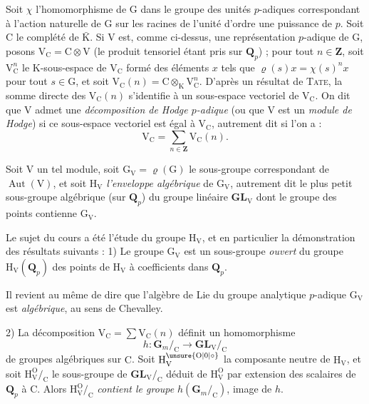 Soit $\chi$ l’homomorphisme de $\mathrm{G}$ dans le groupe des unités $p$-adiques correspondant à l’action naturelle de $\mathrm{G}$ sur les racines de l’unité d’ordre une puissance de $p$. Soit $\mathrm{C}$ le complété de $\bar{\mathrm{K}}$. Si $\mathrm{V}$ est, comme ci-dessus, une représentation $p$-adique de $\mathrm{G}$, posons $\mathrm{V}_{\mathrm{C}}=\mathrm{C}\otimes\mathrm{V}$ (le produit tensoriel étant pris sur $\mathbf{Q}_p$) ; pour tout $n\in\mathbf{Z}$, soit $\mathrm{V}_{\mathrm{C}}^n$ le $\mathrm{K}$-sous-espace de $\mathrm{V}_{\mathrm{C}}$ formé des éléments $x$ tels que $\varrho(s)x=\chi(s)^nx$ pour tout $s\in\mathrm{G}$, et soit $\mathrm{V}_{\mathrm{C}}(n)=\mathrm{C}\otimes_{\mathrm{K}}\mathrm{V}_{\mathrm{C}}^n$. D’après un résultat de \textsc{Tate}, la somme directe des $\mathrm{V}_{\mathrm{C}}(n)$ s’identifie à un sous-espace vectoriel de $\mathrm{V}_{\mathrm{C}}$. On dit que $\mathrm{V}$ admet une \textit{décomposition de Hodge $p$-adique} (ou que $\mathrm{V}$ est un \textit{module de Hodge}) si ce sous-espace vectoriel est égal à $\mathrm{V}_{\mathrm{C}}$, autrement dit si l’on a :
\[
\mathrm{V}_{\mathrm{C}}=\sum_{n\in\mathbf{Z}}\mathrm{V}_{\mathrm{C}}(n).
\]

Soit $\mathrm{V}$ un tel module, soit $\mathrm{G}_{\mathrm{V}}=\varrho(\mathrm{G})$ le sous-groupe correspondant de $\operatorname{Aut}(\mathrm{V})$, et soit $\mathrm{H}_{\mathrm{V}}$ \textit{l’enveloppe algébrique} de $\mathrm{G}_{\mathrm{V}}$, autrement dit le plus petit sous-groupe algébrique (sur $\mathbf{Q}_p$) du groupe linéaire $\mathbf{GL}_{\mathrm{V}}$ dont le groupe des points contienne $\mathrm{G}_{\mathrm{V}}$.

Le sujet du cours a été l’étude du groupe $\mathrm{H}_{\mathrm{V}}$, et en particulier la démonstration des résultats suivants :
1) Le groupe $\mathrm{G}_{\mathrm{V}}$ est un sous-groupe \textit{ouvert} du groupe $\mathrm{H}_{\mathrm{V}}(\mathbf{Q}_p)$ des points de $\mathrm{H}_{\mathrm{V}}$ à coefficients dans $\mathbf{Q}_p$.

Il revient au même de dire que l’algèbre de Lie du groupe analytique $p$-adique $\mathrm{G}_{\mathrm{V}}$ est \textit{algébrique}, au sens de Chevalley.

2) La décomposition $\mathrm{V}_{\mathrm{C}}=\sum\mathrm{V}_{\mathrm{C}}(n)$ définit un homomorphisme
\[
h:\mathbf{G}_m/_{\mathrm{C}}\longrightarrow\mathbf{GL}_{\mathrm{V}}/_{\mathrm{C}}
\]
de groupes algébriques sur $\mathrm{C}$. Soit $\mathrm{H}_{\mathrm{V}}^{\unsure{\mathrm{O}|0|\circ}}$ la composante neutre de $\mathrm{H}_{\mathrm{V}}$, et soit $\mathrm{H}_{\mathrm{V}}^{\mathrm{O}}/_{\mathrm{C}}$ le sous-groupe de $\mathbf{GL}_{\mathrm{V}}/_{\mathrm{C}}$ déduit de $\mathrm{H}_{\mathrm{V}}^{\mathrm{O}}$ par extension des scalaires de $\mathbf{Q}_p$ à $\mathrm{C}$. Alors $\mathrm{H}_{\mathrm{V}}^{\mathrm{O}}/_{\mathrm{C}}$ \textit{contient le groupe} $h(\mathbf{G}_m/_{\mathrm{C}})$, image de $h$.

